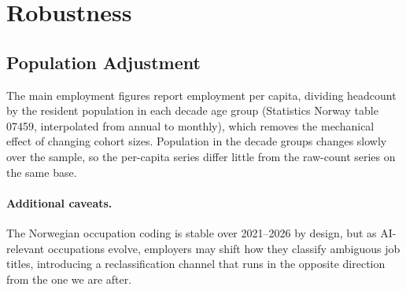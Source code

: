 \section{Robustness}\label{sec:robustness}

\subsection{Population Adjustment}\label{sec:robustness:adjustment}

The main employment figures report employment per capita, dividing headcount by the resident population in each decade age group (Statistics Norway table 07459, interpolated from annual to monthly), which removes the mechanical effect of changing cohort sizes. Population in the decade groups changes slowly over the sample, so the per-capita series differ little from the raw-count series on the same base.

\paragraph{Additional caveats.} The Norwegian occupation coding is stable over 2021--2026 by design, but as AI-relevant occupations evolve, employers may shift how they classify ambiguous job titles, introducing a reclassification channel that runs in the opposite direction from the one we are after.



